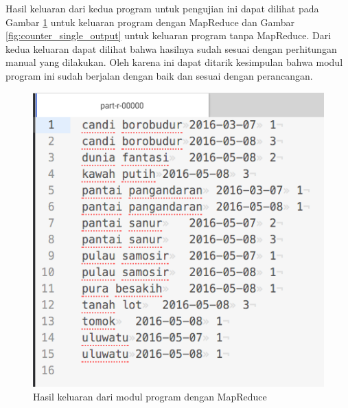 Hasil keluaran dari kedua program untuk pengujian ini dapat dilihat pada Gambar \ref{fig:counter_mp_output} untuk keluaran program dengan MapReduce dan Gambar \ref{fig:counter_single_output} untuk keluaran program tanpa MapReduce. Dari kedua keluaran dapat dilihat bahwa hasilnya sudah sesuai dengan perhitungan manual yang dilakukan. Oleh karena ini dapat ditarik kesimpulan bahwa modul program ini sudah berjalan dengan baik dan sesuai dengan perancangan.

\begin{figure}[H]
	\centering
	\includegraphics[scale=0.5]{Gambar/counter-mp-output.png}
	\caption[Hasil keluaran dari modul program dengan MapReduce]{Hasil keluaran dari modul program dengan MapReduce} 
	\label{fig:counter_mp_output}
\end{figure}

